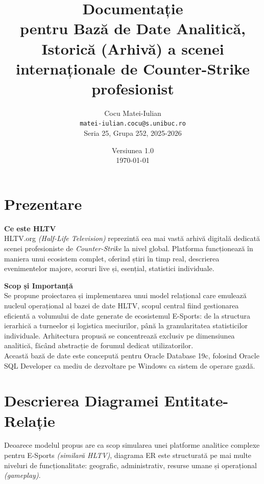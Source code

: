 \documentclass[11pt, a4paper]{article}
\newcommand{\projectname}{Bază de Date Analitică, Istorică (Arhivă) a scenei internaționale de Counter-Strike profesionist}
\newcommand{\dbmsname}{Oracle Database 19c}
\begin{document}
\title{
    Documentație \\
    \large pentru \projectname
}
\author{
    Cocu Matei-Iulian \\
    \small \texttt{matei-iulian.cocu@s.unibuc.ro} \\
    Seria 25, Grupa 252, 2025-2026
}
\date{Versiunea 1.0 \\ \today}
\maketitle

\newpage

\tableofcontents
\newpage

\section{Prezentare}

\textbf{Ce este HLTV} \\
HLTV.org \textit{(Half-Life Television)} reprezintă cea mai vastă arhivă digitală dedicată scenei profesioniste de \textit{Counter-Strike} la nivel global. Platforma funcționează în maniera unui ecosistem complet, oferind știri în timp real, descrierea evenimentelor majore, scoruri live și, esențial, statistici individuale.
\vspace{0.5cm}

\textbf{Scop și Importanță} \\
Se propune proiectarea și implementarea unui model relațional care emulează nucleul operațional al bazei de date HLTV, scopul central fiind gestionarea eficientă a volumului de date generate de ecosistemul E-Sports: de la structura ierarhică a turneelor și logistica meciurilor, până la granularitatea statisticilor individuale. Arhitectura propusă se concentrează exclusiv pe dimensiunea analitică, făcând abstracție de forumul dedicat utilizatorilor. \\ Această bază de date este concepută pentru \dbmsname, folosind Oracle SQL Developer ca mediu de dezvoltare pe Windows ca sistem de operare gazdă.

\section{Descrierea Diagramei Entitate-Relație}
Deoarece modelul propus are ca scop simularea unei platforme analitice complexe pentru E-Sports \textit{(similară HLTV)}, diagrama ER este structurată pe mai multe niveluri de funcționalitate: geografic, administrativ, resurse umane și operațional \textit{(gameplay)}.
\end{document}
